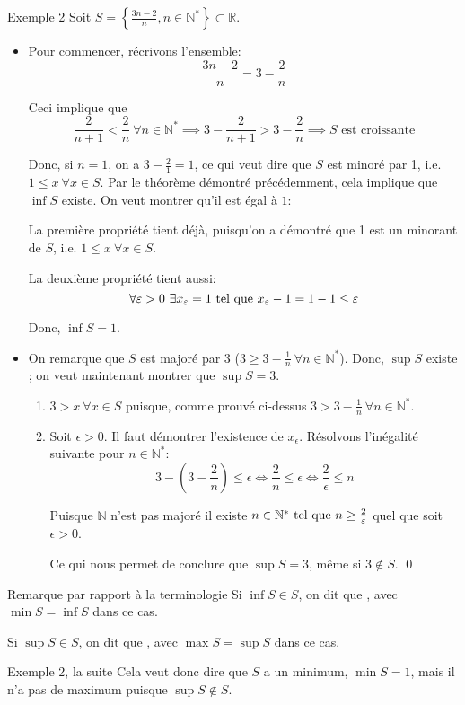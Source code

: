 \documentclass{article}
\begin{document}
\begin{parag}{Exemple 2}
    Soit $S = \left\{\frac{3n - 2}{n}, n \in \mathbb{N}^*\right\} \subset \mathbb{R}$.
    \begin{itemize}
        \item Pour commencer, récrivons l'ensemble:
        \[\frac{3n - 2}{n} = 3 - \frac{2}{n}\]

        Ceci implique que
        \[\frac{2}{n+1} < \frac{2}{n}\ \forall n \in \mathbb{N}^* \implies 3 - \frac{2}{n+1} > 3 - \frac{2}{n} \implies S \text{ est croissante}\]

        Donc, si $n = 1$, on a $3 - \frac{2}{1} = 1$, ce qui veut dire que $S$ est minoré par 1, i.e. $1 \leq x\ \forall x \in S$. Par le théorème démontré précédemment, cela implique que $\inf S$ existe. On veut montrer qu'il est égal à $1$:

        La première propriété tient déjà, puisqu'on a démontré que 1 est un minorant de $S$, i.e. $1 \leq x\ \forall x \in S$.

        La deuxième propriété tient aussi:
        \[\forall \varepsilon > 0\ \exists x_{\varepsilon} = 1 \text{ tel que } x_{\varepsilon} - 1 = 1-1 \leq \varepsilon\]

        Donc, $\inf S = 1$.


    \item On remarque que $S$ est majoré par $3$ ($3 \geq 3 - \frac{1}{n} \ \forall n \in \mathbb{N}^*$). Donc, $\sup S$ existe ; on veut maintenant montrer que $\sup S = 3$.
        \begin{enumerate}
            \item $3 > x\ \forall x \in S$ puisque, comme prouvé ci-dessus $3 > 3 - \frac{1}{n}\ \forall n \in \mathbb{N}^*$.
            \item Soit $\epsilon > 0$. Il faut démontrer l'existence de $x_{\epsilon}$. Résolvons l'inégalité suivante pour $n \in \mathbb{N}^*$:
                \[3 - \left(3 - \frac{2}{n}\right) \leq \epsilon \iff \frac{2}{n} \leq \epsilon \iff \frac{2}{\epsilon} \leq n\]

              Puisque $\mathbb{N}$ n'est pas majoré il existe $n \in \mathbb{N}^* \text{ tel que } n \geq \frac{2}{\varepsilon}$ quel que soit $\epsilon > 0$.

              Ce qui nous permet de conclure que $\sup S = 3$, même si $3 \not\in S$.
              \qed
        \end{enumerate}


    \end{itemize}

\end{parag}

\begin{parag}{Remarque par rapport à la terminologie}
    Si $\inf S \in S$, on dit que , avec $\min S = \inf S$ dans ce cas.

    Si $\sup S \in S$, on dit que , avec $\max S = \sup S$ dans ce cas.
\end{parag}

\begin{parag}{Exemple 2, la suite}
    Cela veut donc dire que $S$ a un minimum, $\min S = 1$, mais il n'a pas de maximum puisque $\sup S \not \in S$.
\end{parag}
\end{document}
